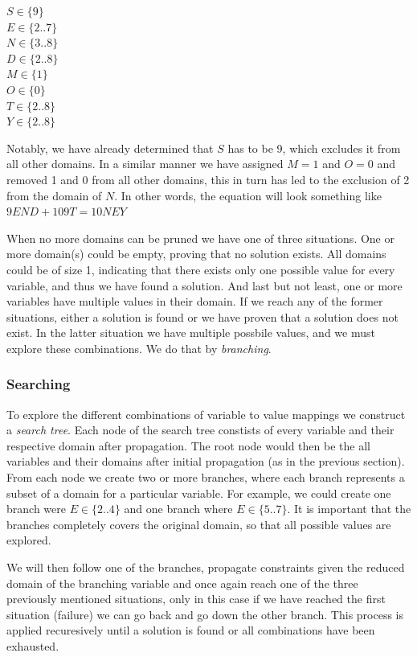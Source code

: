 \vspace{0.5cm}
\noindent
$S \in \{9\}$ \\
$E \in \{2..7\}$ \\
$N \in \{3..8\}$ \\
$D \in \{2..8\}$ \\
$M \in \{1\}$ \\
$O \in \{0\}$ \\
$T \in \{2..8\}$ \\
$Y \in \{2..8\}$

Notably, we have already determined that $S$ has to be 9, which excludes it from all other
domains. In a similar manner we have assigned $M=1$ and $O=0$ and removed 1 and 0 from all
other domains, this in turn has led to the exclusion of 2 from the domain of $N$. In other
words, the equation will look something like $9END + 109T = 10NEY$

When no more domains can be pruned we have one of three situations. One or more domain(s)
could be empty, proving that no solution exists. All domains could be of size 1, indicating
that there exists only one possible value for every variable, and thus we have found a
solution. And last but not least, one or more variables have multiple values in their
domain. If we reach any of the former situations, either a solution is found or we have proven
that a solution does not exist. In the latter situation we have multiple possbile values,
and we must explore these combinations. We do that by \textit{branching}.

\subsubsection{Searching}

To explore the different combinations of variable to value mappings we construct a \textit{
search tree}. Each node of the search tree constists of every variable and their respective
domain after propagation. The root node would then be the all variables and their domains
after initial propagation (as in the previous section). From each node we create two or
more branches, where each branch represents a subset of a domain for a particular variable.
For example, we could create one branch were $E \in \{2..4\}$ and one branch where $E \in 
\{5..7\}$. It is important that the branches completely covers the original
domain, so that all possible values are explored.

We will then follow one of the branches, propagate constraints given the reduced domain
of the branching variable and once again reach one of the three previously mentioned
situations, only in this case if we have reached the first situation (failure) we can go
back and go down the other branch. This process is applied recuresively until a solution
is found or all combinations have been exhausted.

